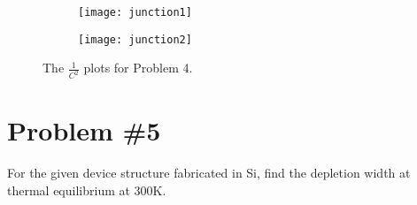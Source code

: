 \documentclass{article}
\begin{document}
\begin{figure}[ht!]
  \centering
  \begin{subfigure}[b]{\textwidth}
    \texttt{[image: junction1]}
  \end{subfigure} 

  \begin{subfigure}[b]{\textwidth}
    \texttt{[image: junction2]}
  \end{subfigure}
  \caption{The $\frac{1}{C^2}$ plots for Problem 4. \label{fig:capplots}}
\end{figure}

\pagebreak

\section*{Problem \#5}
For the given device structure fabricated in Si, find the depletion width
at thermal equilibrium at 300K.
\end{document}
